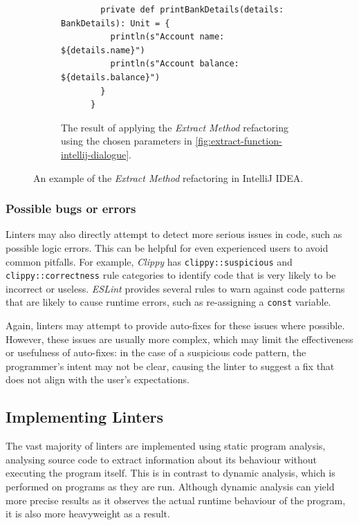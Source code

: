 \documentclass[../../main.tex]{subfiles}
\begin{document}
\begin{figure}[htbp]
\begin{subfigure}{\textwidth}
\begin{verbatim}
        private def printBankDetails(details: BankDetails): Unit = {
          println(s"Account name: ${details.name}")
          println(s"Account balance: ${details.balance}")
        }
      }
    \end{verbatim}
    \caption{The result of applying the \emph{Extract Method} refactoring using the chosen parameters in \cref{fig:extract-function-intellij-dialogue}.}
  \end{subfigure}
  \caption{An example of the \emph{Extract Method} refactoring in IntelliJ IDEA.}
  \label{fig:extract-function-intellij}
\end{figure}

\subsubsection{Possible bugs or errors}

Linters may also directly attempt to detect more serious issues in code, such as possible logic errors.
This can be helpful for even experienced users to avoid common pitfalls.
For example, \emph{Clippy} has \texttt{clippy::suspicious} and \texttt{clippy::correctness} rule categories to identify code that is very likely to be incorrect or useless.
\emph{ESLint} provides several rules to warn against code patterns that are likely to cause runtime errors, such as re-assigning a \texttt{const} variable.

Again, linters may attempt to provide auto-fixes for these issues where possible.
However, these issues are usually more complex, which may limit the effectiveness or usefulness of auto-fixes: in the case of a suspicious code pattern, the programmer's intent may not be clear, causing the linter to suggest a fix that does not align with the user's expectations.

\subsection{Implementing Linters}


The vast majority of linters are implemented using static program analysis, analysing source code to extract information about its behaviour without executing the program itself. 
This is in contrast to dynamic analysis, which is performed on programs as they are run.
Although dynamic analysis can yield more precise results as it observes the actual runtime behaviour of the program, it is also more heavyweight as a result.
\end{document}
